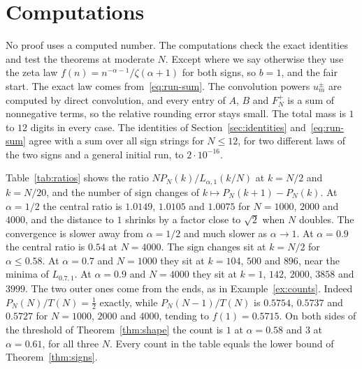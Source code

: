 \section{Computations}\label{sec:verify}

No proof uses a computed number. The computations check the exact identities and test
the theorems at moderate $N$. Except where we say otherwise they use the zeta law
$f(n)=n^{-\alpha-1}/\zeta(\alpha+1)$ for both signs, so $b=1$, and the fair start. The
exact law comes from~\eqref{eq:run-sum}. The convolution powers $u^\pm_m$ are computed by
direct convolution, and every entry of $A$, $B$ and $F^\plus_N$ is a sum of nonnegative
terms, so the relative rounding error stays small. The total mass is $1$ to $12$ digits in
every case. The identities of Section~\ref{sec:identities} and~\eqref{eq:run-sum} agree
with a sum over all sign strings for $N\le12$, for two different laws of the two signs and
a general initial run, to $2\cdot10^{-16}$.

Table~\ref{tab:ratios} shows the ratio $NP_N(k)/L_{\alpha,1}(k/N)$ at $k=N/2$ and $k=N/20$,
and the number of sign changes of $k\mapsto P_N(k+1)-P_N(k)$. At $\alpha=1/2$ the central
ratio is $1.0149$, $1.0105$ and $1.0075$ for $N=1000$, $2000$ and $4000$, and the
distance to $1$ shrinks by a factor close to $\sqrt2$ when $N$ doubles. The convergence is
slower away from $\alpha=1/2$ and much slower as $\alpha\to1$. At $\alpha=0.9$ the central
ratio is $0.54$ at $N=4000$. The sign changes sit at $k=N/2$ for $\alpha\le0.58$. At
$\alpha=0.7$ and $N=1000$ they sit at $k=104$, $500$ and $896$, near the minima of
$L_{0.7,1}$. At $\alpha=0.9$ and $N=4000$ they sit at $k=1$, $142$, $2000$, $3858$ and
$3999$. The two outer ones come from the ends, as in Example~\ref{ex:counts}. Indeed
$P_N(N)/T(N)=\frac12$ exactly, while $P_N(N-1)/T(N)$ is $0.5754$, $0.5737$ and $0.5727$ for
$N=1000$, $2000$ and $4000$, tending to $f(1)=0.5715$. On both sides of the threshold of
Theorem~\ref{thm:shape} the count is $1$ at $\alpha=0.58$ and $3$ at $\alpha=0.61$, for all
three $N$. Every count in the table equals the lower bound of Theorem~\ref{thm:signs}.

